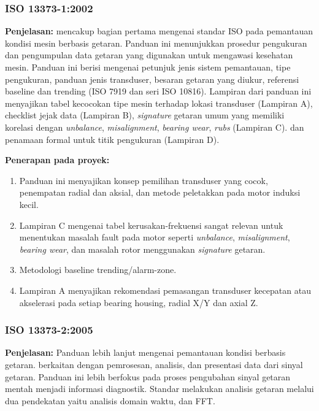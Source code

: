 \documentclass{elsinta}
\begin{document}
\subsubsection{ISO 13373-1:2002}
\textbf{Penjelasan:} 
\cite{InternationalOrganizationforStandardization2002} mencakup bagian pertama mengenai standar ISO pada pemantauan kondisi mesin berbasis getaran. Panduan ini menunjukkan prosedur pengukuran dan pengumpulan data getaran yang digunakan untuk mengawasi kesehatan mesin. Panduan ini berisi mengenai petunjuk jenis sistem pemantauan, tipe pengukuran, panduan jenis transduser, besaran getaran yang diukur, referensi baseline dan trending (ISO 7919 dan seri ISO 10816). Lampiran dari panduan ini menyajikan tabel kecocokan tipe mesin terhadap lokasi transduser (Lampiran A), checklist jejak data (Lampiran B), \textit{signature} getaran umum yang memiliki korelasi dengan \textit{unbalance}, \textit{misalignment}, \textit{bearing wear}, \textit{rubs }(Lampiran C). dan penamaan formal untuk titik pengukuran (Lampiran D).

\textbf{Penerapan pada proyek:}
\begin{enumerate}
    \item Panduan ini menyajikan konsep pemilihan transduser yang cocok, penempatan radial dan aksial, dan metode peletakkan pada motor induksi kecil.
    \item Lampiran C mengenai tabel kerusakan-frekuensi sangat relevan untuk menentukan masalah fault pada motor seperti \textit{unbalance}, \textit{misalignment}, \textit{bearing wear}, dan masalah rotor menggunakan \textit{signature} getaran.
    \item Metodologi baseline trending/alarm-zone.
    \item Lampiran A menyajikan rekomendasi pemasangan transduser kecepatan atau akselerasi pada setiap bearing housing, radial X/Y dan axial Z.
\end{enumerate}

\subsubsection{ISO 13373-2:2005}
\textbf{Penjelasan:} Panduan lebih lanjut mengenai pemantauan kondisi berbasis getaran. \cite{InternationalOrganizationforStandardization2016} berkaitan dengan pemrosesan, analisis, dan presentasi data dari sinyal getaran. Panduan ini lebih berfokus pada proses pengubahan sinyal getaran mentah menjadi informasi diagnostik. Standar melakukan analisis getaran melalui dua pendekatan yaitu analisis domain waktu, dan FFT.
\end{document}
